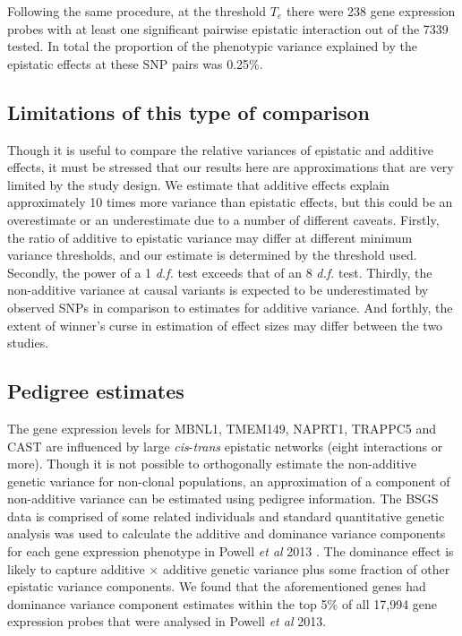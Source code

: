 \documentclass{article}
\begin{document}
Following the same procedure, at the threshold $T_{e}$ there were 238 gene expression probes with at least one significant pairwise epistatic interaction out of the 7339 tested. In total the proportion of the phenotypic variance explained by the epistatic effects at these SNP pairs was 0.25\%.

\subsection{Limitations of this type of comparison}

Though it is useful to compare the relative variances of epistatic and additive effects, it must be stressed that our results here are approximations that are very limited by the study design. We estimate that additive effects explain approximately 10 times more variance than epistatic effects, but this could be an overestimate or an underestimate due to a number of different caveats. Firstly, the ratio of additive to epistatic variance may differ at different minimum variance thresholds, and our estimate is determined by the threshold used. Secondly, the power of a 1 \emph{d.f.} test exceeds that of an 8 \emph{d.f.} test. Thirdly, the non-additive variance at causal variants is expected to be underestimated by observed SNPs in comparison to estimates for additive variance. And forthly, the extent of winner's curse in estimation of effect sizes may differ between the two studies.


\subsection{Pedigree estimates}

The gene expression levels for MBNL1, TMEM149, NAPRT1, TRAPPC5 and CAST are influenced by large \emph{cis}-\emph{trans} epistatic networks (eight interactions or more). Though it is not possible to orthogonally estimate the non-additive genetic variance for non-clonal populations, an approximation of a component of non-additive variance can be estimated using pedigree information. The BSGS data is comprised of some related individuals and standard quantitative genetic analysis was used to calculate the additive and dominance variance components for each gene expression phenotype in Powell \emph{et al} 2013 \cite{Powell2013}. The dominance effect is likely to capture additive $\times$ additive genetic variance plus some fraction of other epistatic variance components. We found that the aforementioned genes had dominance variance component estimates within the top 5\% of all 17,994 gene expression probes that were analysed in Powell \emph{et al} 2013.
\end{document}
